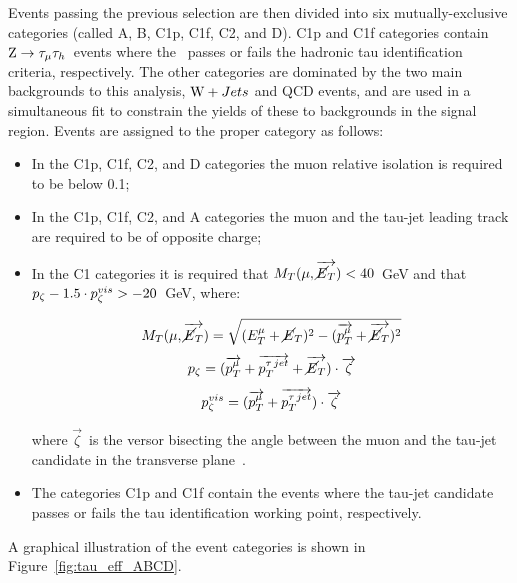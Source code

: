 Events passing the previous selection are then divided into six mutually-exclusive categories (called A, B, C1p, C1f, C2, and D). C1p and C1f categories contain $\mathrm{Z}\rightarrow\tau_\mu\tau_h$\ events where the \tauh\ passes or fails the hadronic tau identification criteria, respectively. The other categories are dominated by the two main backgrounds to this analysis, $\mathrm{W}+Jets$ and QCD events, and are used in a simultaneous fit to constrain the yields of these to backgrounds in the signal region.
Events are assigned to the proper category as follows: %
\begin{itemize}
\item In the C1p, C1f, C2, and D categories the muon relative isolation is required to be below 0.1;
\item In the C1p, C1f, C2, and A categories the muon and the tau-jet leading track are required to be of opposite charge;
\item In the C1 categories it is required that $M_T(\mu, \overrightarrow{\cancel{E}_T}) < 40$\ GeV and that $p_\zeta -1.5 \cdot p_\zeta^{vis} > -20$\ GeV, where:

\begin{equation}
 M_T(\mu, \overrightarrow{\cancel{E}_T}) = \sqrt{(E_{T}^\mu+\cancel{E}_T)^2 - (\overrightarrow{p_{T}^\mu}+\overrightarrow{\cancel{E}_T})^2}
\end{equation}
\begin{equation}
 p_\zeta = (\overrightarrow{p_{T}^\mu} + \overrightarrow{p_{T}^{\tau\,jet}} + \overrightarrow{\cancel{E}_T}) \cdot \overrightarrow{\zeta}
\end{equation}
\begin{equation}
 p_\zeta^{vis} = (\overrightarrow{p_{T}^\mu} + \overrightarrow{p_{T}^{\tau\,jet}}) \cdot \overrightarrow{\zeta}
\end{equation}

where $\vec{\zeta}$\ is the versor bisecting the angle between the muon and the tau-jet candidate in the transverse plane~\cite{CDFrefPzeta}.%
\item The categories C1p and C1f contain the events where the tau-jet candidate passes or fails the tau identification working point, respectively.
\end{itemize}

A graphical illustration of the event categories is shown in Figure~\ref{fig:tau_eff_ABCD}.

